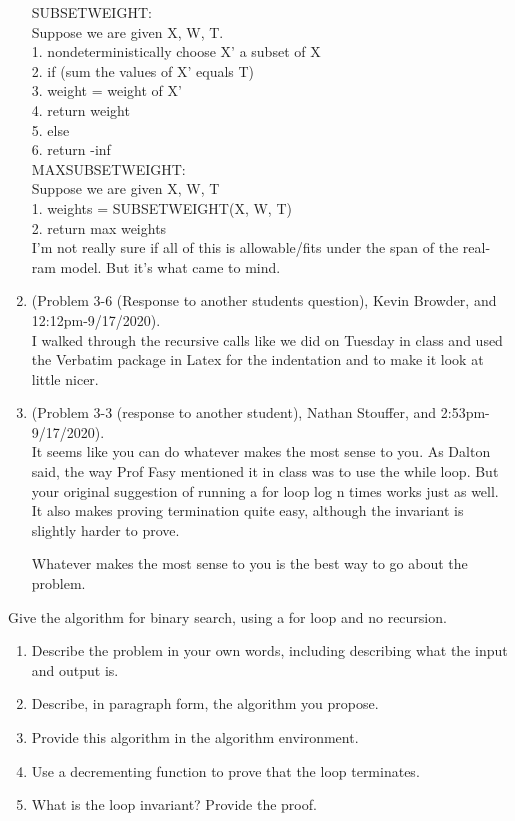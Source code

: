 \documentclass{article}
\begin{document}
\begin{enumerate}
        SUBSETWEIGHT: \\
        Suppose we are given X, W, T.\\
        1. nondeterministically choose X' a subset of X\\
        2. if (sum the values of X' equals T)\\
        3.     weight = weight of X'\\
        4.     return weight\\
        5. else\\
        6.     return -inf\\

        MAXSUBSETWEIGHT:\\
        Suppose we are given X, W, T\\
        1. weights = SUBSETWEIGHT(X, W, T)\\
        2. return max { weights }\\

        I'm not really sure if all of this is allowable/fits under the span of the real-ram model. But it's what came to mind.

    \item (Problem 3-6 (Response to another students question), Kevin Browder, and 12:12pm-9/17/2020). \\
    I walked through the recursive calls like we did on Tuesday in class and used the Verbatim package in Latex for the indentation and to make it look at little nicer.
    \item (Problem 3-3 (response to another student), Nathan Stouffer, and 2:53pm-9/17/2020).\\
        It seems like you can do whatever makes the most sense to you. As Dalton said, the way Prof Fasy mentioned it in class was to use the while loop. But your original suggestion of running a for loop log n times works just as well. It also makes proving termination quite easy, although the invariant is slightly harder to prove.

        Whatever makes the most sense to you is the best way to go about the problem.
\end{enumerate}


\nextprob
{}

Give the algorithm for binary search, using a for loop and no recursion.

\begin{enumerate}
    \item Describe the problem in your own words, including describing what the input and output is.
    \item Describe, in paragraph form, the algorithm you propose.
    \item Provide this algorithm in the algorithm environment.
    \item Use a decrementing function to prove that the loop terminates.
    \item What is the loop invariant? Provide the proof.
\end{enumerate}
\end{document}
